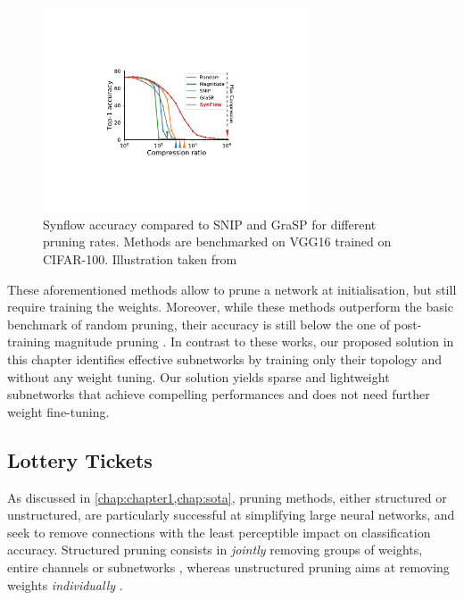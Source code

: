 \begin{figure}[htbp]
  \centering
  \includegraphics[width=0.7\textwidth]{chapter_2/assets/synflow_perfs.pdf}
  \caption{Synflow accuracy compared to SNIP and GraSP for different pruning
  rates. Methods are benchmarked on VGG16 trained on CIFAR-100. Illustration
  taken from \cite{DBLP:conf/nips/TanakaKYG20}} 
  \label{fig:chap2:synflow_perfs}
\end{figure}

These aforementioned methods allow to prune a network at initialisation, but
still require training the weights. Moreover, while these methods outperform the
basic benchmark of random pruning, their accuracy is still below the one of
post-training magnitude pruning \cite{frankle2020pruning}. In contrast to these
works, our proposed solution in this chapter identifies effective subnetworks by
training only their topology and without any weight tuning. Our solution yields
sparse and lightweight subnetworks that achieve compelling performances and does
not need further weight fine-tuning.\\

\subsection{Lottery Tickets} 
As discussed in \cref{chap:chapter1,chap:sota}, pruning methods, either
structured or unstructured, are particularly successful at simplifying large
neural networks, and seek to remove connections with the least perceptible
impact on classification accuracy. Structured pruning consists in {\it jointly}
removing groups of weights, entire channels or subnetworks
\cite{DBLP:conf/iclr/0022KDSG17, DBLP:conf/iccv/LiuLSHYZ17}, whereas
unstructured pruning aims at removing weights {\it individually}
\cite{DBLP:conf/nips/HanPTD15,DBLP:journals/corr/HanMD15}.\\

